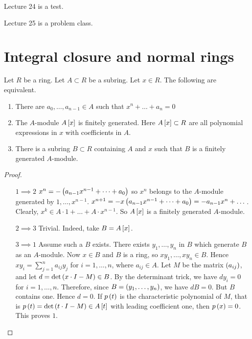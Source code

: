 
Lecture 24 is a test.


Lecture 25 is a problem class.

\pagebreak

\section{Integral closure and normal rings}


\begin{theorem}
\label{thm:13.1}
Let $ R $ be a ring. Let $ A \subset R $ be a subring. Let $ x \in R $. The following are equivalent.
\begin{enumerate}
\item There are $ a_0, \dots, a_{n - 1} \in A $ such that $ x^n + \dots + a_n = 0 $
\item The $ A $-module $ A\sb{x} $ is finitely generated. Here $ A\sb{x} \subset R $ are all polynomial expressions in $ x $ with coefficients in $ A $.
\item There is a subring $ B \subset R $ containing $ A $ and $ x $ such that $ B $ is a finitely generated $ A $-module.
\end{enumerate}
\end{theorem}

\begin{proof}
\hfill
\begin{itemize}[leftmargin=0.5in]
\item[$ 1 \implies 2 $] $ x^n = -\rb{a_{n - 1}x^{n - 1} + \dots + a_0} $ so $ x^n $ belongs to the $ A $-module generated by $ 1, \dots, x^{n - 1} $. $ x^{n + 1} = -x\rb{a_{n - 1}x^{n - 1} + \dots + a_0} = -a_{n - 1}x^n + \dots $. Clearly, $ x^k \in A \cdot 1 + \dots + A \cdot x^{n - 1} $. So $ A\sb{x} $ is a finitely generated $ A $-module.
\item[$ 2 \implies 3 $] Trivial. Indeed, take $ B = A\sb{x} $.
\item[$ 3 \implies 1 $] Assume such a $ B $ exists. There exists $ y_1, \dots, y_n $ in $ B $ which generate $ B $ as an $ A $-module. Now $ x \in B $ and $ B $ is a ring, so $ xy_1, \dots, xy_n \in B $. Hence $ xy_i = \sum_{j = 1}^n a_{ij}y_j $ for $ i = 1, \dots, n $, where $ a_{ij} \in A $. Let $ M $ be the matrix $ \rb{a_{ij}} $, and let $ d = \det\rb{x \cdot I - M} \in B $. By the determinant trick, we have $ dy_i = 0 $ for $ i = 1, \dots, n $. Therefore, since $ B = \rb{y_1, \dots, y_n} $, we have $ dB = 0 $. But $ B $ contains one. Hence $ d = 0 $. If $ p\rb{t} $ is the characteristic polynomial of $ M $, that is $ p\rb{t} = \det\rb{t \cdot I - M} \in A\sb{t} $ with leading coefficient one, then $ p\rb{x} = 0 $. This proves $ 1 $.
\end{itemize}
\end{proof}

